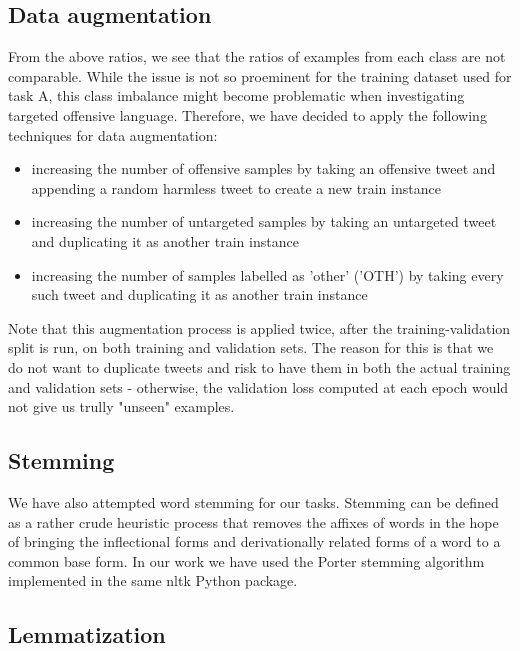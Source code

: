 \documentclass[11pt,a4paper]{article}
\begin{document}
\subsection{Data augmentation}

From the above ratios, we see that the ratios of examples from each class are not comparable. While the issue is not so proeminent for the training dataset used for task A, this class imbalance might become problematic when investigating targeted offensive language. Therefore, we have decided to apply the following techniques for data augmentation:
\begin{itemize}
    \item increasing the number of offensive samples by taking an offensive tweet and appending a random harmless tweet to create a new train instance
    \item increasing the number of untargeted samples by taking an untargeted tweet and duplicating it as another train instance
    \item increasing the number of samples labelled as 'other' ('OTH') by taking every such tweet and duplicating it as another train instance
\end{itemize}

Note that this augmentation process is applied twice, after the training-validation split is run, on both training and validation sets. The reason for this is that we do not want to duplicate tweets and risk to have them in both the actual training and validation sets - otherwise, the validation loss computed at each epoch would not give us trully "unseen" examples.

\subsection{Stemming}

We have also attempted word stemming for our tasks. Stemming can be defined as a rather crude heuristic process that removes the affixes of words in the hope of bringing the inflectional forms and derivationally related forms of a word to a common base form. In our work we have used the Porter stemming algorithm implemented in the same nltk Python package.

\subsection{Lemmatization}
\end{document}
